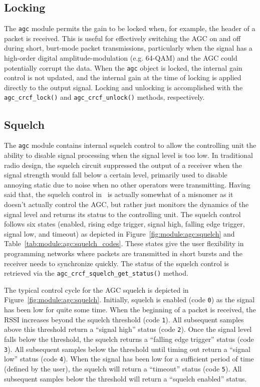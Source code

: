 \subsection{Locking}
The {\tt agc} module permits the gain to be locked when, for example, the
header of a packet is received.
This is useful for effectively switching the AGC on and off during short,
burt-mode packet transmissions, particularly when the signal has a high-order
digital amplitude-modulation (e.g. 64-QAM) and the AGC could potentially
corrupt the data.
When the {\tt agc} object is locked, the internal gain control is not updated,
and the internal gain at the time of locking is applied directly to the output
signal.
%
Locking and unlocking is accomplished with the
{\tt agc\_crcf\_lock()} and
{\tt agc\_crcf\_unlock()} methods, respectively.

\subsection{Squelch}
The {\tt agc} module contains internal squelch control to allow the
controlling unit the ability to disable signal processing when the signal
level is too low.
In traditional radio design, the squelch circuit suppressed the
output of a receiver when the signal strength would fall below a certain level,
primarily used to disable annoying static due to noise when no other operators
were transmitting.
Having said that, the squelch control in \liquid\ is actually somewhat of a
misnomer as it doesn't actually control the AGC, but rather just monitors the
dynamics of the signal level and returns its status to the controlling unit.
The squelch control follows six states
(enabled, rising edge trigger, signal high, falling edge trigger,
signal low, and timeout)
as depicted in
Figure~\ref{fig:module:agc:squelch} and
Table~\ref{tab:module:agc:squelch_codes}.
These states give the user flexibility in programming networks where packets
are transmitted in short bursts and the receiver needs to synchronize quickly.
The status of the squelch control is retrieved via the
{\tt agc\_crcf\_squelch\_get\_status()} method.

The typical control cycle for the AGC squelch is depicted in
Figure~\ref{fig:module:agc:squelch}.
Initially, squelch is enabled (code {\tt 0}) as the signal has been low for
quite some time.
When the beginning of a packet is received, the RSSI increases beyond the
squelch threshold (code {\tt 1}).
All subsequent samples above this threshold return a ``signal high'' status
(code {\tt 2}).
Once the signal level falls below the threshold, the squelch returns a
``falling edge trigger'' status (code {\tt 3}).
All subsequent samples below the threshold until timing out return a ``signal
low'' status (code {\tt 4}).
When the signal has been low for a sufficient period of time (defined by the
user), the squelch will return a ``timeout'' status (code {\tt 5}).
All subsequent samples below the threshold will return a ``squelch enabled''
status.

